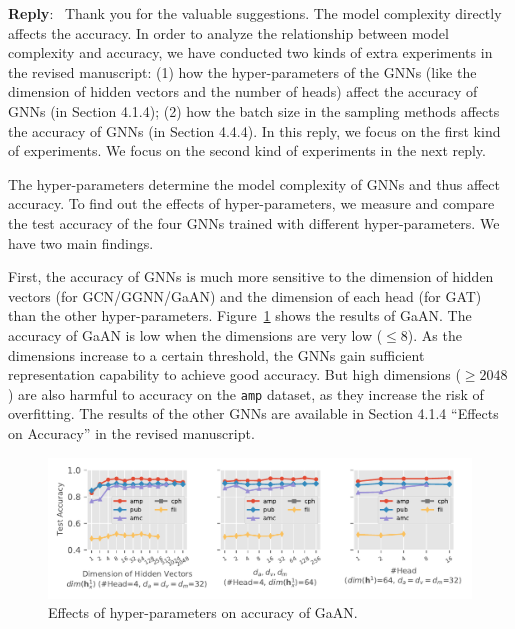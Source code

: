 \documentclass[12pt]{article}
\newenvironment{reply}
   {\medskip \noindent \textbf{Reply}:\  }
   {\medskip}
\begin{document}
\begin{reply}
    Thank you for the valuable suggestions.
    The model complexity directly affects the accuracy.
    In order to analyze the relationship between model complexity and accuracy, we have conducted two kinds of extra experiments in the revised manuscript: (1) how the hyper-parameters of the GNNs (like the dimension of hidden vectors and the number of heads) affect the accuracy of GNNs (in Section 4.1.4); (2) how the batch size in the sampling methods affects the accuracy of GNNs (in Section 4.4.4).
    In this reply, we focus on the first kind of experiments.
    We focus on the second kind of experiments in the next reply.
    
    The hyper-parameters determine the model complexity of GNNs and thus affect accuracy.
    To find out the effects of hyper-parameters, we measure and compare the test accuracy of the four GNNs trained with different hyper-parameters.
    We have two main findings.
    
    First, the accuracy of GNNs is much more sensitive to the dimension of hidden vectors (for GCN/GGNN/GaAN) and the dimension of each head (for GAT) than the other hyper-parameters.
    Figure~\ref{fig:effect_of_hyper_parameter_on_accuracy_of_gaan} shows the results of GaAN.
    The accuracy of GaAN is low when the dimensions are very low ($\leq 8$).
    As the dimensions increase to a certain threshold, the GNNs gain sufficient representation capability to achieve good accuracy.
    But high dimensions ($\geq 2048$) are also harmful to accuracy on the \texttt{amp} dataset, as they increase the risk of overfitting.
    The results of the other GNNs are available in Section 4.1.4 ``Effects on Accuracy'' in the revised manuscript.
   
    
    \begin{figure}[h]
        \includegraphics[width=1.0\columnwidth]{../figs/experiments/exp_hyperparameter_on_accuracy_gaan.pdf}
        \caption{Effects of hyper-parameters on accuracy of GaAN.}
        \label{fig:effect_of_hyper_parameter_on_accuracy_of_gaan}
   

\end{figure}
\end{reply}
\end{document}
